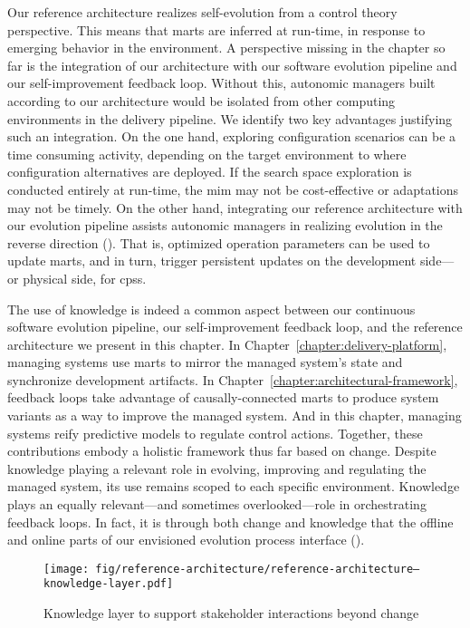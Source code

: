 Our reference architecture realizes self-evolution from a control theory perspective. This means that \glspl{mart} are inferred at run-time, in response to emerging behavior in the environment. A perspective missing in the chapter so far is the integration of our architecture with our software evolution pipeline and our self-improvement feedback loop. Without this, autonomic managers built according to our architecture would be isolated from other computing environments in the delivery pipeline. We identify two key advantages justifying such an integration. On the one hand, exploring configuration scenarios can be a time consuming activity, depending on the target environment to where configuration alternatives are deployed. If the search space exploration is conducted entirely at run-time, the \gls{mim} may not be cost-effective or adaptations may not be timely. On the other hand, integrating our reference architecture with our evolution pipeline assists autonomic managers in realizing evolution in the reverse direction (). That is, optimized operation parameters can be used to update \glspl{mart}, and in turn, trigger persistent updates on the development side---or physical side, for \glspl{cps}.

The use of knowledge is indeed a common aspect between our continuous software evolution pipeline, our self-improvement feedback loop, and the reference architecture we present in this chapter. In Chapter~\ref{chapter:delivery-platform}, managing systems use \glspl{mart} to mirror the managed system's state and synchronize development artifacts. In Chapter~\ref{chapter:architectural-framework}, feedback loops take advantage of causally-connected \glspl{mart} to produce system variants as a way to improve the managed system. And in this chapter, managing systems reify predictive models to regulate control actions. Together, these contributions embody a holistic framework thus far based on change. Despite knowledge playing a relevant role in evolving, improving and regulating the managed system, its use remains scoped to each specific environment. Knowledge plays an equally relevant---and sometimes overlooked---role in orchestrating feedback loops. In fact, it is through both change and knowledge that the offline and online parts of our envisioned evolution process interface ().

\begin{figure}[h]
	\centering
	\texttt{[image: fig/reference-architecture/reference-architecture--knowledge-layer.pdf]}
	\caption{Knowledge layer to support stakeholder interactions beyond change}
	\label{fig:reference-architecture--knowledge-layer}
\end{figure}

